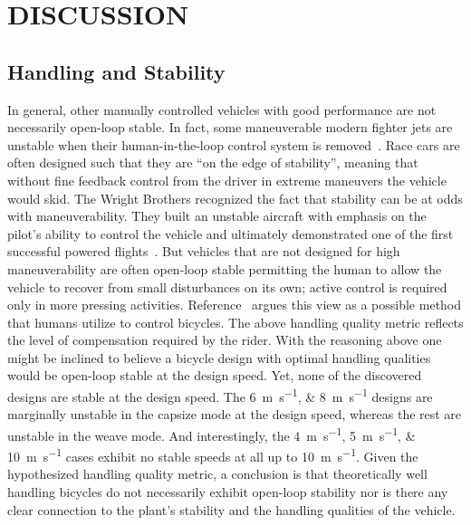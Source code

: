 \documentclass{bmd2016p}
\begin{document}
\section{DISCUSSION}
%
\subsection{Handling and Stability}
%
In general, other manually controlled vehicles with good performance are not necessarily open-loop stable. In fact, some maneuverable modern fighter jets are unstable when their human-in-the-loop control system is removed~\cite{Wikipedia2016}. Race cars are often designed such that they are ``on the edge of stability'', meaning that without fine feedback control from the driver in extreme maneuvers the vehicle would skid. The Wright Brothers recognized the fact that stability can be at odds with maneuverability. They built an unstable aircraft with emphasis on the pilot's ability to control the vehicle and ultimately demonstrated one of the first successful powered flights~\cite{Anderson1986}. But vehicles that are not designed for high maneuverability are often open-loop stable permitting the human to allow the vehicle to recover from small disturbances on its own; active control is required only in more pressing activities. Reference~\cite{Wilson2004} argues this view as a possible method that humans utilize to control bicycles.
The above handling quality metric reflects the level of compensation required by the rider. With the reasoning above one might be inclined to believe a bicycle design with optimal handling qualities would be open-loop stable at the design speed. Yet, none of the discovered designs are stable at the design speed. The \SIlist{6;8}{\meter\per\second} designs are marginally unstable in the capsize mode at the design speed, whereas the rest are unstable in the weave mode. And interestingly, the \SIlist{4;5;10}{\meter\per\second} cases exhibit no stable speeds at all up to 10~\si{\meter\per\second}. Given the hypothesized handling quality metric, a conclusion is that theoretically well handling bicycles do not necessarily exhibit open-loop stability nor is there any clear connection to the plant's stability and the handling qualities of the vehicle.
\end{document}
